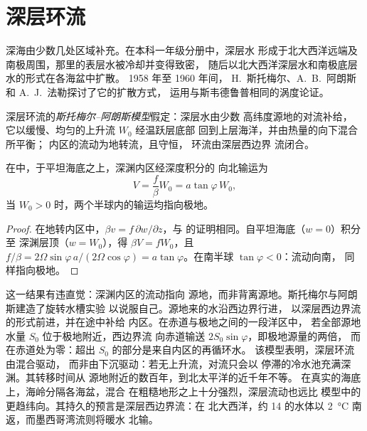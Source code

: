 \section{深层环流}\label{sec:b3:ocean-dynamics:abyssal}

深海由少数几处区域补充。在本科一年级分册中，深层水
形成于北大西洋远端及南极周围，那里的表层水被冷却并变得致密，
随后以北大西洋深层水和南极底层水的形式在各海盆中扩散。
1958 年至 1960 年间，
H.~斯托梅尔、A.~B.~阿朗斯和 A.~J.~法勒探讨了它的扩散方式，
运用与斯韦德鲁普相同的涡度论证。

\begin{definition}\label{def:b3:ocean-dynamics:abyssal}
深层环流的\emph{斯托梅尔–阿朗斯模型}假定：深层水由少数
高纬度源地的对流补给，
它以缓慢、均匀的上升流 $W_0$ 经温跃层底部
回到上层海洋，并由热量的向下混合所平衡；
内区的流动为地转流，且守恒，
环流由深层西边界
流闭合。
\end{definition}

\begin{proposition}[深渊内区的极向流动]\label{prop:b3:ocean-dynamics:abyssal}
在中，于平坦海底之上，深渊内区经深度积分的
向北输运为
\[
V = \frac{f}{\beta}W_0 = a\tan\varphi\,W_0 ,
\]
当 $W_0 > 0$ 时，两个半球内的输运均指向极地。
\end{proposition}

\begin{proof}
在地转内区中，$\beta v = f\,\partial w/\partial z$，与
的证明相同。自平坦海底（$w = 0$）积分至
深渊层顶（$w = W_0$），得 $\beta V =
fW_0$，且 $f/\beta = 2\Omega\sin\varphi\,a/(2\Omega\cos\varphi) =
a\tan\varphi$。在南半球 $\tan\varphi < 0$：流动向南，
同样指向极地。
\end{proof}

这一结果有违直觉：深渊内区的流动指向
源地，而非背离源地。斯托梅尔与阿朗斯建造了旋转水槽实验
以说服自己。源地来的水沿西边界行进，
以深层西边界流的形式前进，并在途中补给
内区。在赤道与极地之间的一段洋区中，
若全部源地水量 $S_0$ 位于极地附近，西边界流
向赤道输送 $2S_0\sin\varphi$，即极地源量的两倍，
而在赤道处为零：超出 $S_0$ 的部分是来自内区的再循环水。
该模型表明，深层环流由混合驱动，
而非由下沉驱动：若无上升流，对流只会以
停滞的冷水池充满深渊。其转移时间从
源地附近的数百年，到北太平洋的近千年不等。
在真实的海底上，海岭分隔各海盆，混合
在粗糙地形之上十分强烈，深层流动也远比
模型中的更趋纬向。其持久的预言是深层西边界流：在
北大西洋，约 \qty{14}{\sverdrup} 的水体以
\qty{2}{\celsius} 南返，而墨西哥湾流则将暖水
北输。

